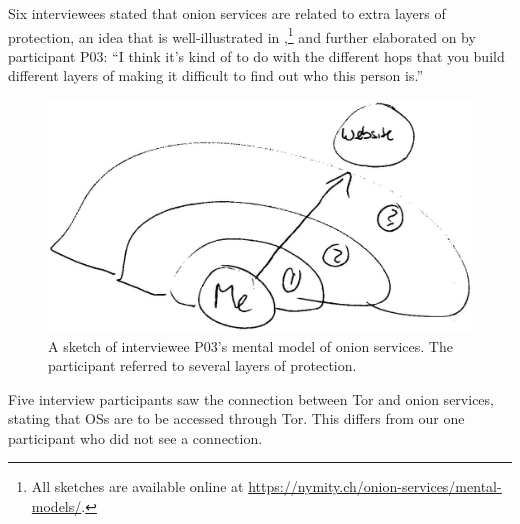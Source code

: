 Six interviewees stated that onion services are related to extra layers of
protection, an idea that is well-illustrated in
,\footnote{All sketches are available online at
\url{https://nymity.ch/onion-services/mental-models/}.} and further elaborated
on by participant P03: ``I think it's kind of to do with the different hops that
you build different layers of making it difficult to find out who this person
is.''

\begin{figure}[t]
  \centering
  \includegraphics[width=0.8\linewidth]{figures/p03-os-sketch-kopia2.jpg}
  \caption{A sketch of interviewee P03's mental model of onion services.  The
  participant referred to several layers of protection.}
  \label{fig:os-sketch}
\end{figure}

Five interview participants saw the connection between Tor and onion services,
stating that OSs are to be accessed through Tor.  This differs from our one
participant who did not see a connection.

%

